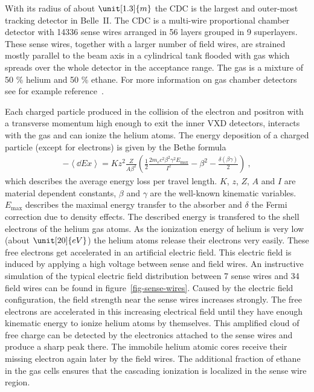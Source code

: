 With its radius of about $\unit[1.3]{m}$ the CDC is the largest and outer-most tracking detector in Belle~II. The CDC is a multi-wire proportional chamber detector with 14336 sense wires arranged in 56 layers grouped in 9 superlayers. These sense wires, together with a larger number of field wires, are strained mostly parallel to the beam axis in a cylindrical tank flooded with gas which spreads over the whole detector in the acceptance range. The gas is a mixture of 50 \% helium and 50 \% ethane. For more information on gas chamber detectors see for example reference~\cite{grupen}.

Each charged particle produced in the collision of the electron and positron with a transverse momentum high enough to exit the inner VXD detectors, interacts with the gas and can ionize the helium atoms. The energy deposition of a charged particle (except for electrons) is given by the Bethe formula~\cite{bethe}
\begin{align}
 - \left\langle \dd{E}{x} \right\rangle = K z^2 \frac{Z}{A \beta^2} \left( \frac 1 2 \frac{2 m_e c^2 \beta^2 \gamma^2 E_\text{max}}{I^2} - \beta^2 - \frac{\delta(\beta \gamma)}{2}  \right) \ , \label{form-bethe}
\end{align}
which describes the average energy loss per travel length. $K$, $z$, $Z$, $A$ and $I$ are material dependent constants, $\beta$ and $\gamma$ are the well-known kinematic variables. $E_\text{max}$ describes the maximal energy transfer to the absorber and $\delta$ the Fermi correction due to density effects. The described energy is transfered to the shell electrons of the helium gas atoms. As the ionization energy of helium is very low (about $\unit[20]{eV}$) the helium atoms release their electrons very easily. These free electrons get accelerated in an artificial electric field. This electric field is induced by applying a high voltage between sense and field wires. An instructive simulation of the typical electric field distribution between 7 sense wires and 34 field wires can be found in figure~\ref{fig-sense-wires}. Caused by the electric field configuration, the field strength near the sense wires increases strongly. The free electrons are accelerated in this increasing electrical field until they have enough kinematic energy to ionize helium atoms by themselves. This amplified cloud of free charge can be detected by the electronics attached to the sense wires and produce a sharp peak there. The immobile helium atomic cores receive their missing electron again later by the field wires. The additional fraction of ethane in the gas cells ensures that the cascading ionization is localized in the sense wire region.

